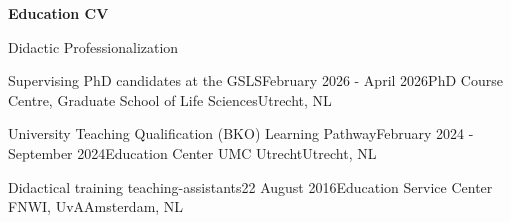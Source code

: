 \hfil{\Large{\bf Education CV}}\hfil\\

\begin{rSection}{Didactic Professionalization}
\begin{rSubsection}{Supervising PhD candidates at the GSLS}{February 2026 - April 2026}{PhD Course Centre, Graduate School of Life Sciences}{Utrecht, NL}
  \vspace{-1.5em}
\end{rSubsection}

\begin{rSubsection}{University Teaching Qualification (BKO) Learning Pathway}{February 2024 - September 2024}{Education Center UMC Utrecht}{Utrecht, NL}
  \vspace{-1.5em}
\end{rSubsection}

\begin{rSubsection}{Didactical training teaching-assistants}{22 August 2016}{Education Service Center FNWI, UvA}{Amsterdam, NL}
  \vspace{-1.5em}
\end{rSubsection}
\end{rSection}

